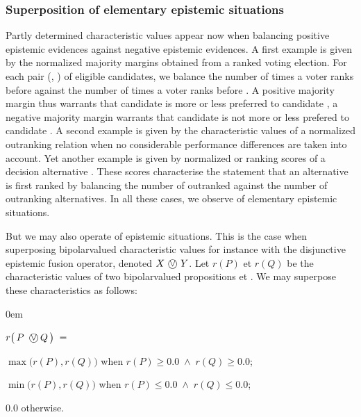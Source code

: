 \documentclass[a4paper,12pt,english]{sphinxhowto}
\begin{document}
\subsubsection{Superposition of elementary epistemic situations}
\label{\detokenize{pearls:superposition-of-elementary-epistemic-situations}}
\sphinxAtStartPar
Partly determined characteristic values appear now when balancing positive epistemic evidences against negative epistemic evidences. A first example is given by the normalized majority margins obtained from a ranked voting election. For each pair (, ) of eligible candidates, we balance the number of times a voter ranks  before  against the number of times a voter ranks  before .  A positive majority margin thus warrants that candidate  is more or less preferred to candidate , a negative majority margin warrants that candidate  is not more or less prefered to candidate . A second example is given by the characteristic values of a normalized outranking relation when no considerable performance differences are taken into account. Yet another example is given by normalized  or  ranking scores of a decision alternative . These scores characterise the statement that an alternative is first ranked by balancing the number of outranked against the number of outranking alternatives. In all these cases, we observe  of elementary epistemic situations.

\sphinxAtStartPar
But we may also operate  of epistemic situations. This is the case when superposing bipolar\sphinxhyphen{}valued characteristic values for instance with the disjunctive epistemic fusion operator, denoted \(X $ \textcircled{$\vee$} $Y\). Let \(r(P)\) et \(r(Q)\) be the characteristic values of two bipolar\sphinxhyphen{}valued propositions  et . We may superpose these characteristics as follows:

\begin{DUlineblock}{0em}
\item[] \(r\big(\,P\,$ \textcircled{$\vee$}$\,Q\,\big) \;=\)
\item[]
\begin{DUlineblock}{\DUlineblockindent}
\item[] \(\max\big(r(P),r(Q)\big)\) when \(r(P) \geq 0.0 \; \land \; r(Q) \geq 0.0\);
\item[] \(\min\big(r(P),r(Q)\big)\) when \(r(P) \leq 0.0 \; \land \; r(Q) \leq 0.0\);
\item[] \(0.0\) otherwise.
\end{DUlineblock}
\end{DUlineblock}
\end{document}
